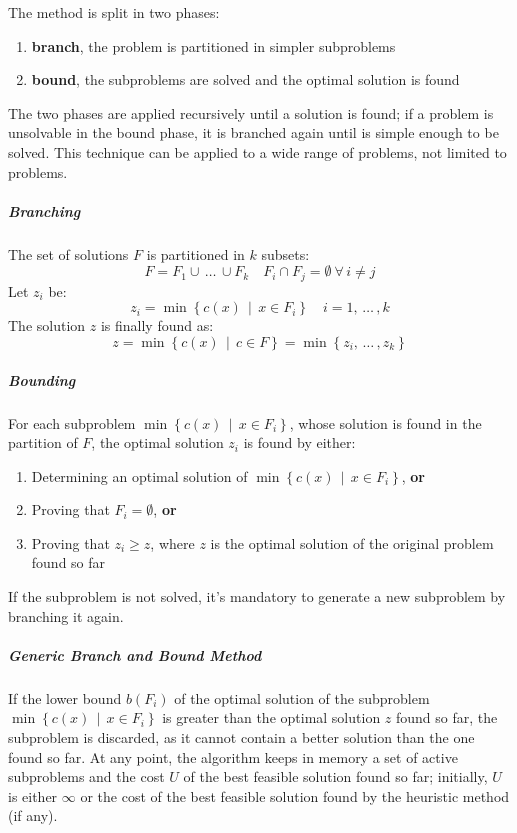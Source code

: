 \documentclass[english]{article}
\begin{document}
The method is split in two phases:

\begin{enumerate}[label=Phase \arabic*., ref=step \arabic*, leftmargin=*, widest*=8, labelindent=1em]
  \item \textbf{branch}, the problem is partitioned in simpler subproblems
  \item \textbf{bound}, the subproblems are solved and the optimal solution is found
\end{enumerate}

The two phases are applied recursively until a solution is found;
if a problem is unsolvable in the bound phase, it is branched again until is simple enough to be solved.
This technique can be applied to a wide range of problems, not limited to \ILP problems.

\subparagraph*{Branching}

The set of solutions \(F\) is partitioned in \(k\) subsets:
\[ F = F_1 \cup \, \ldots \, \cup F_k \quad F_i \cap F_j = \emptyset \ \forall \, i \neq j \]
Let \(z_i\) be:
\[ z_i = \min\left\{ c(x) \,\middle\vert\, x \in F_i \right\} \quad i = 1, \, \ldots \, , k \]
The solution \(z\) is finally found as:
\[ z = \min\left\{ c(x) \,\middle\vert\, c \in F \right\} = \min\left\{ z_i, \, \ldots \,, z_k \right\} \]

\subparagraph*{Bounding}

For each subproblem \(\min\left\{ c(x) \,\middle\vert\, x \in F_i \right\}\), whose solution is found in the partition of \(F\), the optimal solution \(z_i\) is found by either:

\begin{enumerate}
  \item Determining an optimal solution of \(\min\left\{ c(x) \,\middle\vert\, x \in F_i \right\}\), \textbf{or}
  \item Proving that \(F_i = \emptyset\), \textbf{or}
  \item Proving that \(z_i \geq z\), where \(z\) is the optimal solution of the original problem found so far
\end{enumerate}

If the subproblem is not solved, it's mandatory to generate a new subproblem by branching it again.

\subparagraph*{Generic Branch and Bound Method}

If the lower bound \(b(F_i)\) of the optimal solution of the subproblem \(\min\left\{ c(x) \,\middle\vert\, x \in F_i \right\}\) is greater than the optimal solution \(z\) found so far, the subproblem is discarded, as it cannot contain a better solution than the one found so far.
At any point, the algorithm keeps in memory a set of active subproblems and the cost \(U\) of the best feasible solution found so far;
initially, \(U\) is either \(\infty\) or the cost of the best feasible solution found by the heuristic method (if any).
\end{document}
